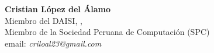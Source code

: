 \begin{center}
\textbf{Cristian López del Álamo}\\
Miembro del DAISI, \University, \city\\
Miembro de la Sociedad Peruana de Computación (SPC)\\
email: \textit{criloal23@gmail.com}
\end{center}

